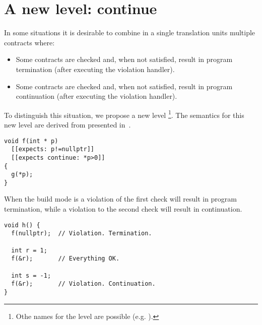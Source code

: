 \section{A new level: continue}
\label{sec:continue}

In some situations it is desirable to combine in a single translation units
multiple contracts where:
\begin{itemize}
	\item Some contracts are checked and, when not satisfied, result in
		program termination (after executing the violation handler).
	\item Some contracts are checked and, when not satisfied, result in
		program continuation (after executing the violation handler).
\end{itemize}

To distinguish this situation, we propose a new level
\footnote{Othe names for the level are possible (e.g.
).}.
The semantics for this new level are derived from
 presented in~\cite{p1332r0}.

\begin{lstlisting}
void f(int * p)
  [[expects: p!=nullptr]]
  [[expects continue: *p>0]]
{
  g(*p);
}
\end{lstlisting}

When the build mode is  a violation of the first check will
result in program termination, while a violation to the second check will result
in continuation.

\begin{lstlisting}
void h() {
  f(nullptr);  // Violation. Termination.

  int r = 1;
  f(&r);       // Everything OK.

  int s = -1;
  f(&r);       // Violation. Continuation.
}
\end{lstlisting}
